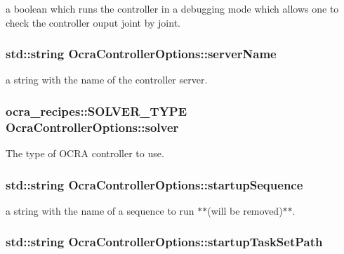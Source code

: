 a boolean which runs the controller in a debugging mode which allows one to check the controller ouput joint by joint. \hypertarget{classOcraControllerOptions_a22380b083fbf0b202993d0415d1d4c83}{
\subsubsection[{server\-Name}]{\setlength{\rightskip}{0pt plus 5cm}std\-::string {\bf \-Ocra\-Controller\-Options\-::server\-Name}}}\label{classOcraControllerOptions_a22380b083fbf0b202993d0415d1d4c83}
a string with the name of the controller server. \hypertarget{classOcraControllerOptions_af79b8705c3f3097b642262bc877eaa8e}{
\subsubsection[{solver}]{\setlength{\rightskip}{0pt plus 5cm}ocra\-\_\-recipes\-::\-S\-O\-L\-V\-E\-R\-\_\-\-T\-Y\-P\-E {\bf \-Ocra\-Controller\-Options\-::solver}}}\label{classOcraControllerOptions_af79b8705c3f3097b642262bc877eaa8e}
\-The type of \-O\-C\-R\-A controller to use. \hypertarget{classOcraControllerOptions_ab01efbd786ad8bc5beb6de02dbcd0936}{
\subsubsection[{startup\-Sequence}]{\setlength{\rightskip}{0pt plus 5cm}std\-::string {\bf \-Ocra\-Controller\-Options\-::startup\-Sequence}}}\label{classOcraControllerOptions_ab01efbd786ad8bc5beb6de02dbcd0936}
a string with the name of a sequence to run $\ast$$\ast$(will be removed)$\ast$$\ast$. \hypertarget{classOcraControllerOptions_af91566ecff3f7ed02571369c7af061ce}{
\subsubsection[{startup\-Task\-Set\-Path}]{\setlength{\rightskip}{0pt plus 5cm}std\-::string {\bf \-Ocra\-Controller\-Options\-::startup\-Task\-Set\-Path}}}\label{classOcraControllerOptions_af91566ecff3f7ed02571369c7af061ce}
